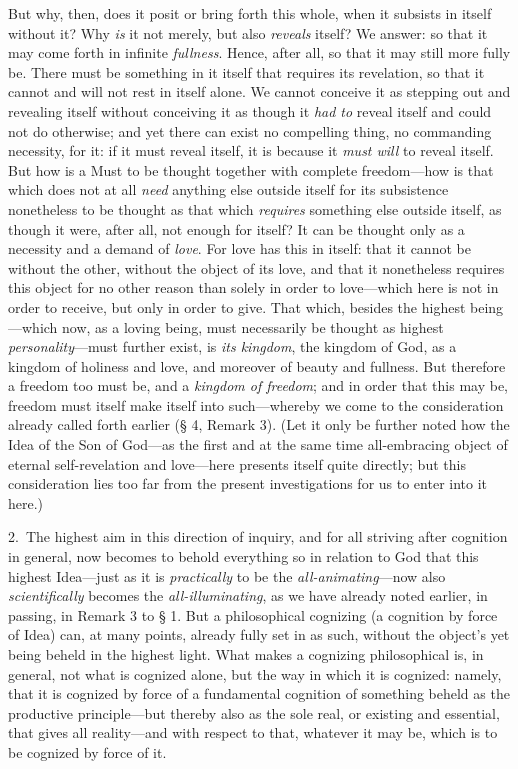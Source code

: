 \documentclass[12pt,a4paper]{book}
\begin{document}
But why, then, does it posit or bring forth this whole, when it subsists in itself
without it? Why \emph{is} it not merely, but also \emph{reveals} itself? We answer: so that
it may come forth in infinite \emph{fullness}. Hence, after all, so that it may
still more fully be. There must be something in it itself that requires its
revelation, so that it cannot and will not rest in itself alone. We cannot conceive
it as stepping out and revealing itself without conceiving it as though it
\emph{had to} reveal itself and could not do otherwise; and yet there can exist no
compelling thing, no commanding necessity, for it: if it must reveal itself, it is
because it \emph{must will} to reveal itself. But how is a Must to be thought
together with complete freedom---how is that which does not at all \emph{need}
anything else outside itself for its subsistence nonetheless to be thought as that
which \emph{requires} something else outside itself, as though it were, after all,
not enough for itself? It can be thought only as a necessity and a demand of
\emph{love}. For love has this in itself: that it cannot be without the other,
without the object of its love, and that it nonetheless requires this object for no
other reason than solely in order to love---which here is not in order to receive,
but only in order to give. That which, besides the highest being---which now, as a
loving being, must necessarily be thought as highest \emph{personality}---must
further exist, is \emph{its kingdom}, the kingdom of God, as a kingdom of holiness
and love, and moreover of beauty and fullness. But therefore a freedom too
must be, and a \emph{kingdom of freedom}; and in order that this may be, freedom
must itself make itself into such---whereby we come to the consideration already
called forth earlier (§ 4, Remark 3). (Let it only be further noted how the Idea of
the Son of God---as the first and at the same time all-embracing object of eternal
self-revelation and love---here presents itself quite directly; but this
consideration lies too far from the present investigations for us to enter into it
here.)

2.~The highest aim in this direction of inquiry, and for all striving after
cognition in general, now becomes to behold everything so in relation to God that
this highest Idea---just as it is \emph{practically} to be the
\emph{all-animating}---now also \emph{scientifically} becomes the
\emph{all-illuminating}, as we have already noted earlier, in passing, in Remark 3
to § 1. But a philosophical cognizing (a cognition by force of Idea) can, at many
points, already fully set in as such, without the object's yet being beheld in the
highest light. What makes a cognizing philosophical is, in general, not what is
cognized alone, but the way in which it is cognized: namely, that it is cognized by
force of a fundamental cognition of something beheld as the productive
principle---but thereby also as the sole real, or existing and essential, that gives
all reality---and with respect to that, whatever it may be, which is to be cognized
by force of it.
\end{document}
